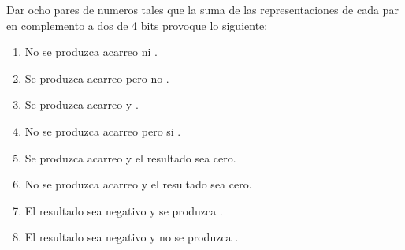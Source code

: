 \begin{enunciado}{\ejercicio}
  Dar ocho pares de numeros tales que la suma de las representaciones de cada
  par en complemento a dos de 4 bits provoque lo siguiente:

  \begin{enumerate}[label=\arabic*)]
    \item No se produzca acarreo ni \overflow.
    \item Se produzca acarreo pero no \overflow.
    \item Se produzca acarreo y \overflow.
    \item No se produzca acarreo pero si \overflow.
    \item Se produzca acarreo y el resultado sea cero.
    \item No se produzca acarreo y el resultado sea cero.
    \item El resultado sea negativo y se produzca \overflow.
    \item El resultado sea negativo y no se produzca \overflow.
  \end{enumerate}
\end{enunciado}

